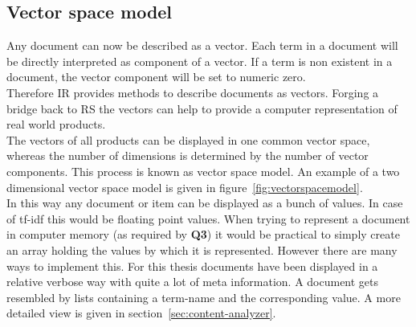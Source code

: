 \subsection{Vector space model}
\label{sec:vectorspacemodel}
Any document can now be described as a vector.
Each term in a document will be directly interpreted as component of a vector.
If a term is non existent in a document, the vector component will be set to numeric zero.\citep[p.~120]{manning:2009}
\\
Therefore IR provides methods to describe documents as vectors.
Forging a bridge back to RS the vectors can help to provide a computer representation of real world products.
\\
The vectors of all products can be displayed in one common vector space, whereas the number of dimensions is determined by the number of vector components.
This process is known as vector space model.\citep[p.~120]{manning:2009}
An example of a two dimensional vector space model is given in figure~\ref{fig:vectorspacemodel}.
\\

In this way any document or item can be displayed as a bunch of values.
In case of tf-idf this would be floating point values.
When trying to represent a document in computer memory (as required by \textbf{Q3}) it would be practical to simply create an array holding the values by which it is represented.
However there are many ways to implement this.
For this thesis documents have been displayed in a relative verbose way with quite a lot of meta information.
A document gets resembled by lists containing a term-name and the corresponding value.
A more detailed view is given in section~\ref{sec:content-analyzer}.

